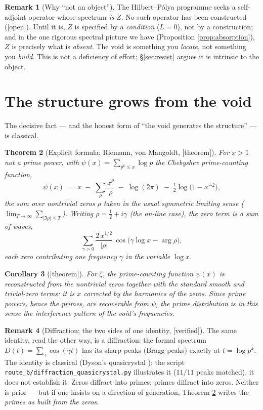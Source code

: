 \documentclass[11pt,a4paper]{article}
\newtheorem{theorem}{Theorem}[section]
\newtheorem{corollary}[theorem]{Corollary}
\theoremstyle{definition}
\newtheorem{remark}[theorem]{Remark}
\newcommand{\TAGthm}{{\small\textsf{[\textcolor{green!45!black}{theorem}]}}}
\newcommand{\TAGver}{{\small\textsf{[\textcolor{blue!60!black}{verified}]}}}
\newcommand{\TAGopen}{{\small\textsf{[\textcolor{red!70!black}{open}]}}}
\begin{document}
\begin{remark}[Why ``not an object'']\label{rem:notobject}
The Hilbert--Pólya programme seeks a self-adjoint operator whose spectrum
\emph{is} $Z$. No such operator has been constructed (\TAGopen). Until it is,
$Z$ is specified by a \emph{condition} ($L=0$), not by a construction; and in
the one rigorous spectral picture we have (Proposition
\ref{prop:absorption}), $Z$ is precisely what is \emph{absent}. The void is
something you \emph{locate}, not something you \emph{build}. This is not a
deficiency of effort; \S\ref{sec:resist} argues it is intrinsic to the object.
\end{remark}

\section{The structure grows from the void}\label{sec:grows}

The decisive fact --- and the honest form of ``the void generates the
structure'' --- is classical.

\begin{theorem}[Explicit formula; Riemann, von Mangoldt, \TAGthm]\label{thm:explicit}
For $x>1$ not a prime power, with $\psi(x)=\sum_{p^k\le x}\log p$ the
Chebyshev prime-counting function,
\[
  \psi(x) \;=\; x \;-\; \sum_{\rho}\frac{x^{\rho}}{\rho}
                  \;-\; \log(2\pi) \;-\; \tfrac12\log\!\bigl(1-x^{-2}\bigr),
\]
the sum over nontrivial zeros $\rho$ taken in the usual symmetric limiting
sense ($\lim_{T\to\infty}\sum_{|\Im\rho|\le T}$). Writing
$\rho=\tfrac12+i\gamma$ (the on-line case), the zero term is a sum of
\emph{waves},
\[
  \sum_{\gamma>0}\frac{2\,x^{1/2}}{|\rho|}\,
     \cos\!\bigl(\gamma\log x-\arg\rho\bigr),
\]
each zero contributing one frequency $\gamma$ in the variable $\log x$.
\end{theorem}

\begin{corollary}[\TAGthm]\label{cor:fromvoid}
For $\zeta$, the prime-counting function $\psi(x)$ is reconstructed from the
nontrivial zeros together with the standard smooth and trivial-zero terms: it
is $x$ corrected by the harmonics of the zeros. Since prime powers, hence the
primes, are recoverable from $\psi$, the prime distribution is in this sense
the \emph{interference pattern} of the void's frequencies.
\end{corollary}

\begin{remark}[Diffraction; the two sides of one identity, \TAGver]
The same identity, read the other way, is a diffraction: the formal spectrum
$D(t)=\sum_\gamma\cos(\gamma t)$ has its sharp peaks (Bragg peaks) exactly at
$t=\log p^k$. The identity is classical (Dyson's quasicrystal \cite{Dyson});
the script \texttt{route\_b/diffraction\_quasicrystal.py} illustrates it
($11/11$ peaks matched), it does not establish it. Zeros diffract into primes; primes diffract into zeros. Neither
is prior --- but if one insists on a direction of generation, Theorem
\ref{thm:explicit} writes the \emph{primes as built from the zeros}.
\end{remark}
\end{document}

